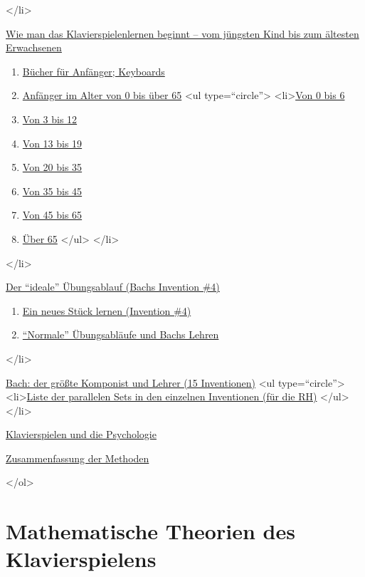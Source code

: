  </li>
 \item \hyperref[c1iii18]{Wie man das Klavierspielenlernen beginnt -- vom jüngsten Kind bis zum ältesten Erwachsenen}
     \begin{enumerate}[label={\alph*.}] 
        <li>\hyperref[c1iii18a]{Benötigt man einen Lehrer?}
        \item \hyperref[c1iii18b]{Bücher für Anfänger; Keyboards}
        \item \hyperref[c1iii18c]{Anfänger im Alter von 0 bis über 65}
            <ul type=\enquote{circle}>
               <li>\hyperref[c1iii18c0]{Von 0 bis 6}
               \item \hyperref[c1iii18c3]{Von 3 bis 12}
               \item \hyperref[c1iii18c13]{Von 13 bis 19}
               \item \hyperref[c1iii18c20]{Von 20 bis 35}
               \item \hyperref[c1iii18c35]{Von 35 bis 45}
               \item \hyperref[c1iii18c45]{Von 45 bis 65}
               \item \hyperref[c1iii18c65]{Über 65}
            </ul>
        </li>
      \end{enumerate}
 </li>
 \item \hyperref[c1iii19]{Der \enquote{ideale} Übungsablauf (Bachs Invention \#4)}
     \begin{enumerate}[label={\alph*.}] 
        <li>\hyperref[c1iii19a]{Die Regeln lernen}
        \item \hyperref[c1iii19b]{Ein neues Stück lernen (Invention \#4)}
        \item \hyperref[c1iii19c]{\enquote{Normale} Übungsabläufe und Bachs Lehren}
      \end{enumerate}
 </li>
 \item \hyperref[c1iii20]{Bach: der größte Komponist und Lehrer (15 Inventionen)}
   <ul type=\enquote{circle}>
    <li>\hyperref[c1iii20ps]{Liste der parallelen Sets in den einzelnen Inventionen (für die RH)}
   </ul>
 </li>
 \item \hyperref[c1iii21]{Klavierspielen und die Psychologie}
 \item \hyperref[c1iii22]{Zusammenfassung der Methoden}

</ol>

\section{Mathematische Theorien des Klavierspielens}

